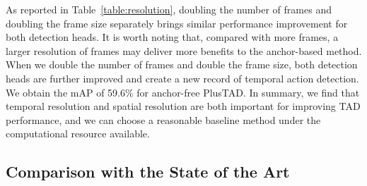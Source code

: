 \documentclass[a4paper,fleqn]{cas-dc}
\begin{document}
As reported in Table~\ref{table:resolution}, doubling the number of frames and doubling the frame size separately brings similar performance improvement for both detection heads. 
It is worth noting that, compared with more frames, a larger resolution of frames may deliver more benefits to the anchor-based method.
When we double the number of frames and double the frame size, both detection heads are further improved and create a new record of temporal action detection. We obtain the mAP of 59.6\% for anchor-free PlusTAD. 
In summary, we find that temporal resolution and spatial resolution are both important for improving TAD performance, and we can choose a reasonable baseline method under the computational resource available.













\begin{table*}[t]
\centering
\small
\caption{\textbf{Summary of configurations} of the optimal PlusTAD on the datasets of THUMOS14, FineAction, and ActivityNet-v1.3. } 
\setlength{}
\label{table:dataset_config}
\end{table*}



\subsection{Comparison with the State of the Art}
\label{comparisonwiththestateoftheart}
\end{document}
